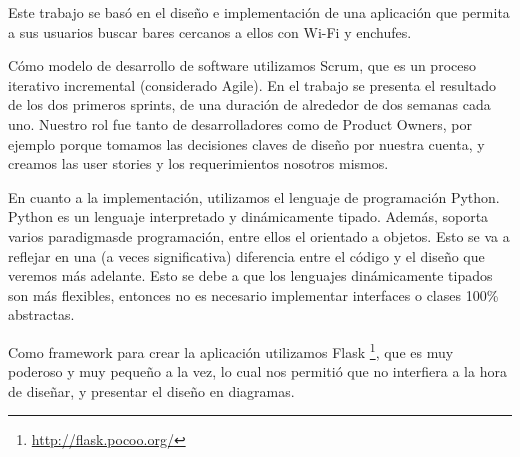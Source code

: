 
Este trabajo se basó en el diseño e implementación de una aplicación que permita a sus usuarios buscar bares cercanos a ellos con Wi-Fi y enchufes.

Cómo modelo de desarrollo de software utilizamos Scrum, que es un proceso iterativo incremental (considerado Agile). En el trabajo se presenta el resultado de los dos primeros sprints, de una duración de alrededor de dos semanas cada uno. Nuestro rol fue tanto de desarrolladores como de Product Owners, por ejemplo porque tomamos las decisiones claves de diseño por nuestra cuenta, y creamos las user stories y los requerimientos nosotros mismos.

En cuanto a la implementación, utilizamos el lenguaje de programación Python. Python es un lenguaje interpretado y dinámicamente tipado. Además, soporta varios paradigmasde programación, entre ellos el orientado a objetos. Esto se va a reflejar en una (a veces significativa) diferencia entre el código y el diseño que veremos más adelante. Esto se debe a que los lenguajes dinámicamente tipados son más flexibles, entonces no es necesario implementar interfaces o clases 100\%
abstractas.

  Como framework para crear la aplicación utilizamos Flask \footnote{\url{http://flask.pocoo.org/}}, que es muy poderoso y muy pequeño a la vez, lo cual nos permitió que no interfiera a la hora de diseñar, y presentar el diseño en diagramas.






